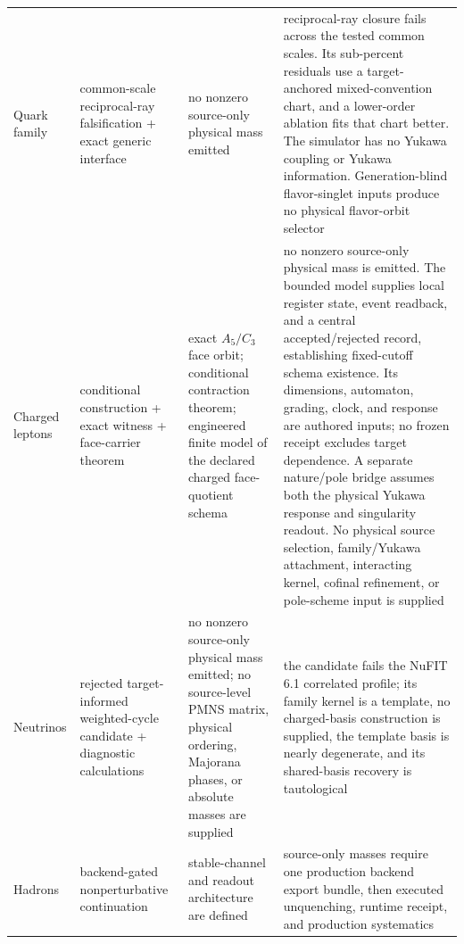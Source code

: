 \begin{longtable}{@{}>{\raggedright\arraybackslash}p{}>{\raggedright\arraybackslash}p{}>{\raggedright\arraybackslash}p{}>{\raggedright\arraybackslash}p{}@{}}
Quark family & common-scale reciprocal-ray falsification + exact generic interface & no nonzero source-only physical mass emitted & reciprocal-ray closure fails across the tested common scales. Its sub-percent residuals use a target-anchored mixed-convention chart, and a lower-order ablation fits that chart better. The simulator has no Yukawa coupling or Yukawa information. Generation-blind flavor-singlet inputs produce no physical flavor-orbit selector \\
Charged leptons & conditional construction + exact witness + face-carrier theorem & exact \(A_5/C_3\) face orbit; conditional contraction theorem; engineered finite model of the declared charged face-quotient schema & no nonzero source-only physical mass is emitted. The bounded model supplies local register state, event readback, and a central accepted/rejected record, establishing fixed-cutoff schema existence. Its dimensions, automaton, grading, clock, and response are authored inputs; no frozen receipt excludes target dependence. A separate nature/pole bridge assumes both the physical Yukawa response and singularity readout. No physical source selection, family/Yukawa attachment, interacting kernel, cofinal refinement, or pole-scheme input is supplied \\
Neutrinos & rejected target-informed weighted-cycle candidate + diagnostic calculations & no nonzero source-only physical mass emitted; no source-level PMNS matrix, physical ordering, Majorana phases, or absolute masses are supplied & the candidate fails the NuFIT 6.1 correlated profile; its family kernel is a template, no charged-basis construction is supplied, the template basis is nearly degenerate, and its shared-basis recovery is tautological \\
Hadrons & backend-gated nonperturbative continuation & stable-channel and readout architecture are defined & source-only masses require one production backend export bundle, then executed unquenching, runtime receipt, and production systematics \\
\end{longtable}
\normalsize

